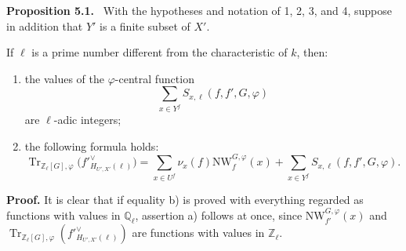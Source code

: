 \documentclass[11pt]{article}
\newenvironment{statement}[1]{\par\medskip\noindent\textbf{#1.}\ }{\par\medskip}
\providecommand{\Tr}{\operatorname{Tr}}
\providecommand{\Tr}{\operatorname{Tr}}
\providecommand{\Tr}{\operatorname{Tr}}
\providecommand{\Tr}{\operatorname{Tr}}
\providecommand{\bZ}{\mathbb Z}
\providecommand{\bQ}{\mathbb Q}
\providecommand{\Tr}{\operatorname{Tr}}
\begin{document}
\begin{statement}{Proposition 5.1}
With the hypotheses and notation of 1, 2, 3, and 4, suppose in addition that $Y'$ is a finite subset of $X'$.

If $\ell$ is a prime number different from the characteristic of $k$, then:
\begin{enumerate}[label=\alph*)]
\item the values of the $\varphi$-central function
\[
\sum_{x\in Y^f}S_{x,\ell}(f,f',G,\varphi)
\]
are $\ell$-adic integers;
\item the following formula holds:
\begin{equation}\tag{5.1.1}
\Tr_{\bZ_\ell[G],\varphi}\bigl(f'^\vee_{H_{U',X'}(\ell)}\bigr)
=\sum_{x\in U^f}\nu_x(f)\mathrm{NW}^{G,\varphi}_f(x)
+\sum_{x\in Y^f}S_{x,\ell}(f,f',G,\varphi).
\end{equation}
\end{enumerate}
\end{statement}

\noindent
\textbf{Proof.} It is clear that if equality b) is proved with everything regarded as functions with values in $\bQ_\ell$, assertion a) follows at once, since $\mathrm{NW}^{G,\varphi}_{f'}(x)$ and $\Tr_{\bZ_\ell[G],\varphi}(f'^\vee_{H_{U',X'}(\ell)})$ are functions with values in $\bZ_\ell$.
\end{document}
